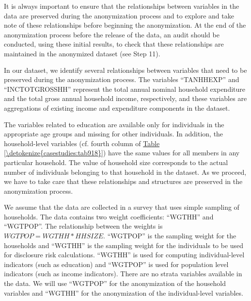 \documentclass[letterpaper,10pt,english]{sphinxmanual}
\begin{document}
It is always important to ensure that the relationships between
variables in the data are preserved during the anonymization process and
to explore and take note of these relationships before beginning the
anonymization. At the end of the anonymization process before the
release of the data, an audit should be conducted, using these initial
results, to check that these relationships are maintained in the
anonymized dataset (see Step 11).

In our dataset, we identify several relationships between variables that
need to be preserved during the anonymization process. The variables
“TANHHEXP” and “INCTOTGROSSHH” represent the total annual nominal
household expenditure and the total gross annual household income,
respectively, and these variables are aggregations of existing income
and expenditure components in the dataset.

The variables related to education are available only for individuals in
the appropriate age groups and missing for other individuals. In
addition, the household-level variables (cf. fourth column of \hyperref[\detokenize{casestudies:tab918}]{Table \ref{\detokenize{casestudies:tab918}}})
have the same values for all members in any particular household.
The value of household size corresponds to the actual number of
individuals belonging to that household in the dataset. As we proceed,
we have to take care that these relationships and structures are
preserved in the anonymization process.

We assume that the data are collected in a survey that uses simple
sampling of households. The data contains two weight coefficients:
“WGTHH” and “WGTPOP”. The relationship between the weights is
\(WGTPOP = WGTHH * HHSIZE\). “WGTPOP” is the sampling weight
for the households and “WGTHH” is the sampling weight for the
individuals to be used for disclosure risk calculations. “WGTHH” is used
for computing individual-level indicators (such as education) and
“WGTPOP” is used for population level indicators (such as income
indicators). There are no strata variables available in the data. We
will use “WGTPOP” for the anonymization of the household variables and
“WGTHH” for the anonymization of the individual-level variables.
\end{document}
